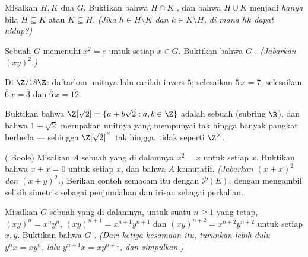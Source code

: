 \begin{exercise}[$\star\star$]\label{exo:b1:structures:6}
Misalkan $H, K$ dua  $G$. Buktikan bahwa $H \cap K$ ,
dan bahwa $H \cup K$ menjadi  \emph{hanya} bila $H \subseteq K$ atau
$K \subseteq H$. \emph{(Jika $h \in H \setminus K$ dan $k \in K
\setminus H$, di mana $hk$ dapat hidup?)}
\end{exercise}

\begin{exercise}[$\star\star$]\label{exo:b1:structures:7}
Sebuah  $G$ memenuhi $x^2 = e$ untuk setiap $x \in G$. Buktikan bahwa $G$
. \emph{(Jabarkan $(xy)^2$.)}
\end{exercise}

\begin{exercise}[$\star\star$]\label{exo:b1:structures:8}
Di $\Z/18\Z$: daftarkan unitnya lalu carilah invers $\overline 5$;
selesaikan $\overline 5\, x = \overline 7$; selesaikan $\overline 6\, x =
\overline 3$ dan $\overline 6\, x = \overline{12}$.
\end{exercise}

\begin{exercise}[$\star\star$]\label{exo:b1:structures:9}
Buktikan bahwa  $\Z[\sqrt 2] = \{a + b\sqrt 2 : a, b \in \Z\}$ adalah
sebuah  (subring $\R$), dan bahwa $1 + \sqrt 2$ merupakan unitnya
yang mempunyai tak hingga banyak pangkat berbeda --- sehingga $\Z[\sqrt 2]^\times$
tak hingga, tidak seperti $\Z^\times$.
\end{exercise}

\begin{exercise}[$\star\star\star$]\label{exo:b1:structures:10}
( Boole) Misalkan $A$ sebuah  yang di dalamnya $x^2 = x$ untuk setiap $x$.
Buktikan bahwa $x + x = 0$ untuk setiap $x$, dan bahwa $A$ komutatif.
\emph{(Jabarkan $(x+x)^2$ dan $(x+y)^2$.)} Berikan contoh 
semacam itu dengan $\mathcal{P}(E)$, dengan mengambil selisih simetris sebagai
penjumlahan dan irisan sebagai perkalian.
\end{exercise}

\begin{exercise}[$\star\star\star$]\label{exo:b1:structures:11}
Misalkan $G$ sebuah  yang di dalamnya, untuk suatu $n \geq 1$ yang tetap, $(xy)^n =
x^n y^n$, $(xy)^{n+1} = x^{n+1}y^{n+1}$ dan $(xy)^{n+2} =
x^{n+2}y^{n+2}$ untuk setiap $x, y$. Buktikan bahwa $G$ .
\emph{(Dari ketiga kesamaan itu, turunkan lebih dulu $y^n x = x y^n$, lalu
$y^{n+1} x = x y^{n+1}$, dan simpulkan.)}
\end{exercise}

